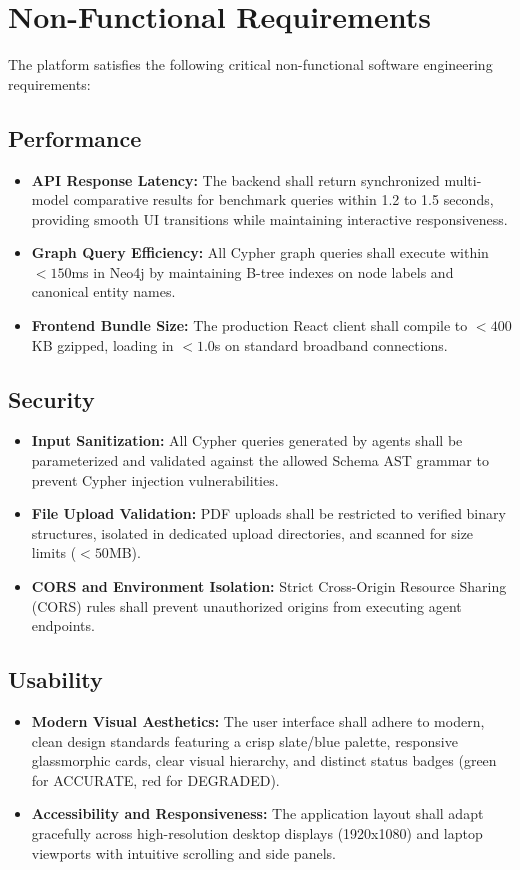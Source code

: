 \section{Non-Functional Requirements}
The platform satisfies the following critical non-functional software engineering requirements:

\subsection{Performance}
\begin{itemize}
    \item \textbf{API Response Latency:} The backend shall return synchronized multi-model comparative results for benchmark queries within 1.2 to 1.5 seconds, providing smooth UI transitions while maintaining interactive responsiveness.
    \item \textbf{Graph Query Efficiency:} All Cypher graph queries shall execute within $<150$ms in Neo4j by maintaining B-tree indexes on node labels and canonical entity names.
    \item \textbf{Frontend Bundle Size:} The production React client shall compile to $<400$KB gzipped, loading in $<1.0$s on standard broadband connections.
\end{itemize}

\subsection{Security}
\begin{itemize}
    \item \textbf{Input Sanitization:} All Cypher queries generated by agents shall be parameterized and validated against the allowed Schema AST grammar to prevent Cypher injection vulnerabilities.
    \item \textbf{File Upload Validation:} PDF uploads shall be restricted to verified binary structures, isolated in dedicated upload directories, and scanned for size limits ($<50$MB).
    \item \textbf{CORS and Environment Isolation:} Strict Cross-Origin Resource Sharing (CORS) rules shall prevent unauthorized origins from executing agent endpoints.
\end{itemize}

\subsection{Usability}
\begin{itemize}
    \item \textbf{Modern Visual Aesthetics:} The user interface shall adhere to modern, clean design standards featuring a crisp slate/blue palette, responsive glassmorphic cards, clear visual hierarchy, and distinct status badges (green for ACCURATE, red for DEGRADED).
    \item \textbf{Accessibility and Responsiveness:} The application layout shall adapt gracefully across high-resolution desktop displays (1920x1080) and laptop viewports with intuitive scrolling and side panels.
\end{itemize}

